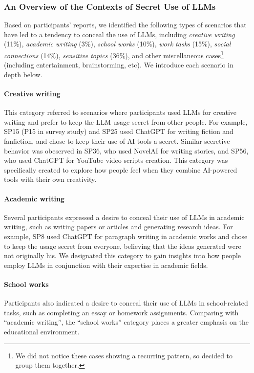 \subsubsection{An Overview of the Contexts of Secret Use of LLMs}
\label{sec: survey-context-results}
Based on participants' reports, we identified the following types of scenarios that have led to a tendency to conceal the use of LLMs, including \textit{creative writing} (11\%), \textit{academic writing} (3\%), \textit{school works} (10\%), \textit{work tasks} (15\%), \textit{social connections} (14\%), \textit{sensitive topics} (36\%), and other miscellaneous cases\footnote{We did not notice these cases showing a recurring pattern, so decided to group them together.} (including entertainment, brainstorming, etc).
We introduce each scenario in depth below.

\paragraph{Creative writing}
This category referred to scenarios where participants used LLMs for creative writing and prefer to keep the LLM usage secret from other people.
For example, SP15 (P15 in survey study) and SP25 used ChatGPT for writing fiction and fanfiction, and chose to keep their use of AI tools a secret.
Similar secretive behavior was obeserved in SP36, who used NovelAI for writing stories, and SP56, who used ChatGPT for YouTube video scripts creation.
This category was specifically created to explore how people feel when they combine AI-powered tools with their own creativity.


\paragraph{Academic writing}
Several participants expressed a desire to conceal their use of LLMs in academic writing, such as writing papers or articles and generating research ideas. 
For example, SP8 used ChatGPT for paragraph writing in academic works and chose to keep the usage secret from everyone, believing that the ideas generated were not originally his.
We designated this category to gain insights into how people employ LLMs in conjunction with their expertise in academic fields.



\paragraph{School works}
Participants also indicated a desire to conceal their use of LLMs in school-related tasks, such as completing an essay or homework assignments.
Comparing with ``academic writing'', the ``school works'' category places a greater emphasis on the educational environment.


